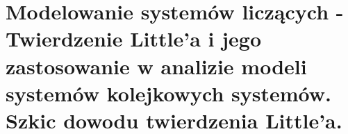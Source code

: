 \section{Modelowanie systemów liczących - Twierdzenie Little'a i jego zastosowanie w analizie modeli systemów kolejkowych systemów. Szkic dowodu twierdzenia Little'a.}
